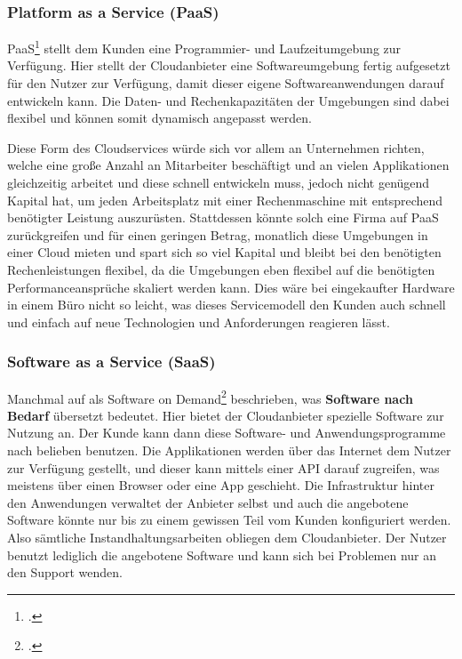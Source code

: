 
\subsubsection{Platform as a Service (PaaS)}
PaaS\footcite{cloud-ms} stellt dem Kunden eine Programmier- und Laufzeitumgebung zur Verfügung. Hier stellt der Cloudanbieter eine Softwareumgebung fertig
aufgesetzt für den Nutzer zur Verfügung, damit dieser eigene Softwareanwendungen darauf entwickeln kann. Die Daten- und Rechenkapazitäten
der Umgebungen sind dabei flexibel und können somit dynamisch angepasst werden.

Diese Form des Cloudservices würde sich vor allem an Unternehmen richten, welche eine große Anzahl an Mitarbeiter beschäftigt und an vielen Applikationen gleichzeitig arbeitet und diese schnell entwickeln muss, jedoch nicht genügend Kapital hat, um jeden Arbeitsplatz mit einer Rechenmaschine mit entsprechend benötigter Leistung auszurüsten. Stattdessen könnte solch eine Firma auf PaaS zurückgreifen und für einen geringen Betrag, monatlich diese Umgebungen in einer Cloud mieten und spart sich so viel Kapital und bleibt bei den benötigten Rechenleistungen flexibel, da die Umgebungen eben flexibel auf die benötigten Performanceansprüche skaliert werden kann. Dies wäre bei eingekaufter Hardware in einem Büro nicht so leicht, was dieses Servicemodell den Kunden auch schnell und einfach auf neue Technologien und Anforderungen reagieren lässt.


\subsubsection{Software as a Service (SaaS)}
Manchmal auf als Software on Demand\footcite{cloud-computing} beschrieben, was \textbf{Software nach Bedarf} übersetzt bedeutet. Hier bietet der Cloudanbieter spezielle Software zur Nutzung an. Der Kunde kann dann diese Software- und Anwendungsprogramme nach belieben benutzen. Die Applikationen werden über das Internet dem Nutzer zur Verfügung gestellt, und dieser kann mittels einer API darauf zugreifen, was meistens über einen Browser oder eine App geschieht. Die Infrastruktur hinter den Anwendungen verwaltet der Anbieter selbst und auch die angebotene Software könnte nur bis zu einem gewissen Teil vom Kunden konfiguriert werden. Also sämtliche Instandhaltungsarbeiten obliegen dem Cloudanbieter. Der Nutzer benutzt lediglich die angebotene Software und kann sich bei Problemen nur an den Support wenden.

